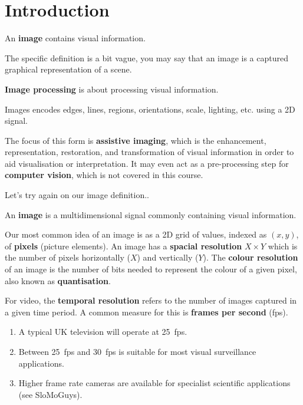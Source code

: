 \chapter{Introduction}

\begin{definition}[Image]
    An \textbf{image} contains visual information.
\end{definition}

The specific definition is a bit vague, you may say that an image is a captured graphical representation of a scene.

\textbf{Image processing} is about processing visual information.

Images encodes edges, lines, regions, orientations, scale, lighting, etc. using a 2D signal.

The focus of this form is \textbf{assistive imaging}, which is the enhancement, representation, restoration, and transformation of visual information in order to aid visualisation or interpretation. It may even act as a pre-processing step for \textbf{computer vision}, which is not covered in this course.

Let's try again on our image definition..

\begin{definition}[Image v2]
    An \textbf{image} is a multidimensional signal commonly containing visual information.
\end{definition}

Our most common idea of an image is as a 2D grid of values, indexed as $(x, y)$, of \textbf{pixels} (picture elements). An image has a \textbf{spacial resolution} $X \times Y$ which is the number of pixels horizontally ($X$) and vertically ($Y$). The \textbf{colour resolution} of an image is the number of bits needed to represent the colour of a given pixel, also known as \textbf{quantisation}.

For video, the \textbf{temporal resolution} refers to the number of images captured in a given time period. A common measure for this is \textbf{frames per second} (fps).

\begin{example}
    \begin{enumerate}
        \item A typical UK television will operate at \SI{25}{fps}.
        \item Between \SI{25}{fps} and \SI{30}{fps} is suitable for most visual surveillance applications.
        \item Higher frame rate cameras are available for specialist scientific applications (see SloMoGuys).
    \end{enumerate}
\end{example}


